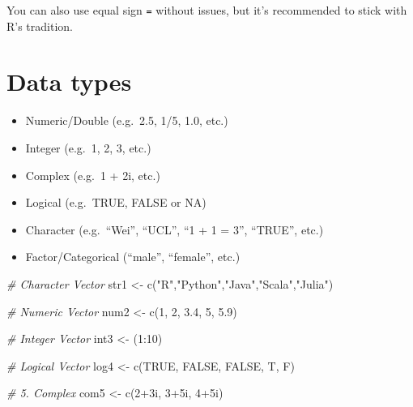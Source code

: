 \documentclass[
  11pt,
]{book}
\newenvironment{Shaded}{\begin{snugshade}}{\end{snugshade}}
\newcommand{\CommentTok}[1]{\textcolor[rgb]{0.56,0.35,0.01}{\textit{#1}}}
\newcommand{\ConstantTok}[1]{\textcolor[rgb]{0.00,0.00,0.00}{#1}}
\newcommand{\DecValTok}[1]{\textcolor[rgb]{0.00,0.00,0.81}{#1}}
\newcommand{\FloatTok}[1]{\textcolor[rgb]{0.00,0.00,0.81}{#1}}
\newcommand{\FunctionTok}[1]{\textcolor[rgb]{0.00,0.00,0.00}{#1}}
\newcommand{\NormalTok}[1]{#1}
\newcommand{\OtherTok}[1]{\textcolor[rgb]{0.56,0.35,0.01}{#1}}
\newcommand{\SpecialCharTok}[1]{\textcolor[rgb]{0.00,0.00,0.00}{#1}}
\newcommand{\StringTok}[1]{\textcolor[rgb]{0.31,0.60,0.02}{#1}}
\begin{document}
You can also use equal sign \texttt{=} without issues, but it's recommended to stick with R's tradition.

\hypertarget{data-types}{%
\section{Data types}\label{data-types}}

\begin{itemize}
\item
  Numeric/Double (e.g.~2.5, 1/5, 1.0, etc.)
\item
  Integer (e.g.~1, 2, 3, etc.)
\item
  Complex (e.g.~1 + 2i, etc.)
\item
  Logical (e.g.~TRUE, FALSE or NA)
\item
  Character (e.g.~``Wei'', ``UCL'', ``1 + 1 = 3'', ``TRUE'', etc.)
\item
  Factor/Categorical (``male'', ``female'', etc.)
\end{itemize}

\begin{Shaded}
\begin{Highlighting}[]
\CommentTok{\# Character Vector}
\NormalTok{str1 }\OtherTok{\textless{}{-}} \FunctionTok{c}\NormalTok{(}\StringTok{"R"}\NormalTok{,}\StringTok{"Python"}\NormalTok{,}\StringTok{"Java"}\NormalTok{,}\StringTok{"Scala"}\NormalTok{,}\StringTok{"Julia"}\NormalTok{)}

\CommentTok{\# Numeric Vector }
\NormalTok{num2 }\OtherTok{\textless{}{-}} \FunctionTok{c}\NormalTok{(}\DecValTok{1}\NormalTok{, }\DecValTok{2}\NormalTok{, }\FloatTok{3.4}\NormalTok{, }\DecValTok{5}\NormalTok{, }\FloatTok{5.9}\NormalTok{)}

\CommentTok{\# Integer Vector  }
\NormalTok{int3 }\OtherTok{\textless{}{-}}\NormalTok{ (}\DecValTok{1}\SpecialCharTok{:}\DecValTok{10}\NormalTok{) }

\CommentTok{\# Logical Vector }
\NormalTok{log4 }\OtherTok{\textless{}{-}} \FunctionTok{c}\NormalTok{(}\ConstantTok{TRUE}\NormalTok{, }\ConstantTok{FALSE}\NormalTok{, }\ConstantTok{FALSE}\NormalTok{, T, F) }

\CommentTok{\# 5. Complex}
\NormalTok{com5 }\OtherTok{\textless{}{-}} \FunctionTok{c}\NormalTok{(}\DecValTok{2}\SpecialCharTok{+}\NormalTok{3i, }\DecValTok{3}\SpecialCharTok{+}\NormalTok{5i, }\DecValTok{4}\SpecialCharTok{+}\NormalTok{5i)}
\end{Highlighting}
\end{Shaded}
\end{document}
